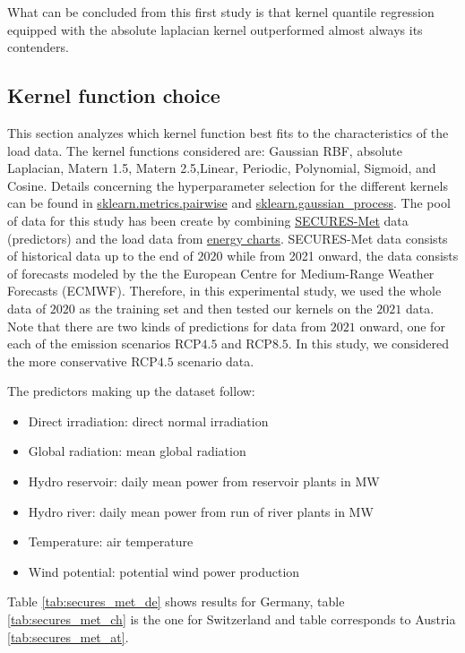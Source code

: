 What can be concluded from this first study is that kernel quantile regression equipped with the absolute laplacian kernel outperformed almost always its contenders.

\subsection{Kernel function choice}
This section analyzes which kernel function best fits to the characteristics of the load data.
The kernel functions considered are: Gaussian RBF, absolute Laplacian, Matern 1.5, Matern 2.5,Linear, Periodic, Polynomial, Sigmoid, and Cosine. 
Details concerning the hyperparameter selection for the different kernels can be found in \href{https://scikit-learn.org/stable/modules/classes.html#module-sklearn.metrics.pairwise}{sklearn.metrics.pairwise} and \href{https://scikit-learn.org/stable/modules/classes.html#module-sklearn.gaussian_process}{sklearn.gaussian\_process}.
The pool of data for this study has been create by combining \href{https://zenodo.org/records/7907883}{SECURES-Met} data (predictors) \cite{Formayer2023} and the load data from \href{https://www.energy-charts.info/index.html?l=en&c=DE}{energy charts}.
SECURES-Met data consists of historical data up to the end of $2020$ while from 2021 onward, the data consists of forecasts modeled by the the European Centre for Medium-Range Weather Forecasts (ECMWF).
Therefore, in this experimental study, we used the whole data of $2020$ as the training set and then tested our kernels on the $2021$ data.
Note that there are two kinds of predictions for data from $2021$ onward, one for each of the emission scenarios RCP$4.5$ and RCP$8.5$. In this study, we considered the more conservative RCP$4.5$ scenario data.

The predictors making up the dataset follow:
\begin{itemize}
    \item Direct irradiation: direct normal irradiation
    \item Global radiation: mean global radiation
    \item Hydro reservoir: daily mean power from reservoir plants in MW
    \item Hydro river: daily mean power from run of river plants in MW
    \item Temperature: air temperature
    \item Wind potential: potential wind power production
\end{itemize}
Table \ref{tab:secures_met_de} shows results for Germany, table \ref{tab:secures_met_ch} is the one for Switzerland and table corresponds to Austria \ref{tab:secures_met_at}.


